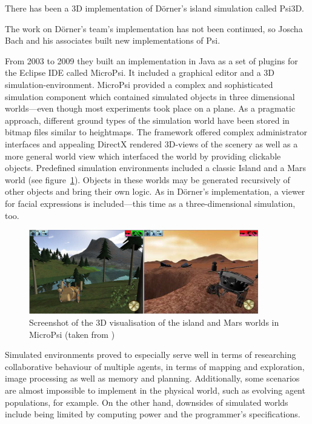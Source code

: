 There has been a 3D implementation of Dörner's island simulation called Psi3D.

The work on Dörner's team's implementation has not been continued, so Joscha Bach and his associates built new implementations of Psi.

From 2003 to 2009 they built an implementation in Java as a set of plugins for the Eclipse IDE called MicroPsi. It included a graphical editor and a 3D simulation-environment. MicroPsi provided a complex and sophisticated simulation component which contained simulated objects in three dimensional worlds---even though most experiments took place on a plane. As a pragmatic approach, different ground types of the simulation world have been stored in bitmap files similar to heightmaps. The framework offered complex administrator interfaces and appealing DirectX rendered 3D-views of the scenery as well as a more general world view which interfaced the world by providing clickable objects. Predefined simulation environments included a classic Island and a Mars world (see figure~\ref{micropsi_3d_screen}). Objects in these worlds may be generated recursively of other objects and bring their own logic. As in Dörner's implementation, a viewer for facial expressions is included---this time as a three-dimensional simulation, too.~\cite{Bach:2009:PSI:1611304}


\begin{figure}[h]
  \centering
    \includegraphics[width=10cm]{graphics/micropsi_3d_screen}
  \caption{Screenshot of the 3D visualisation of the island and Mars worlds in MicroPsi (taken from \cite{Bach:2009:PSI:1611304})}
  \label{micropsi_3d_screen}
\end{figure}

Simulated environments proved to especially serve well in terms of researching collaborative behaviour of multiple agents, in terms of mapping and exploration, image processing as well as memory and planning. Additionally, some scenarios are almost impossible to implement in the physical world, such as evolving agent populations, for example. On the other hand, downsides of simulated worlds include being limited by computing power and the programmer's specifications.~\cite{Bach:2009:PSI:1611304}

